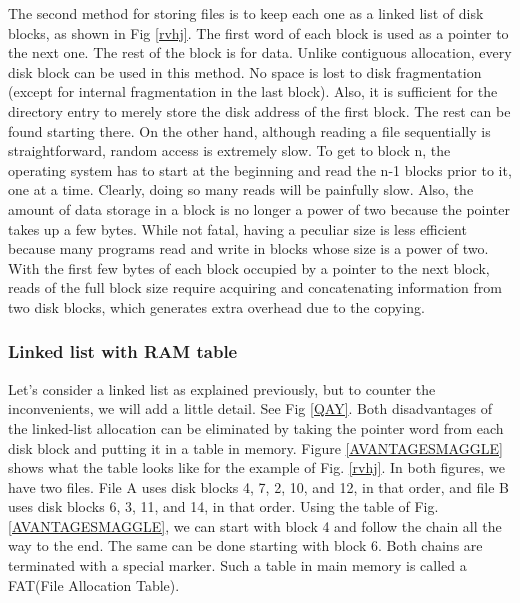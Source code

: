 The second method for storing files is to keep each one as a linked list of disk
blocks, as shown in Fig \ref{rvhj}. The first word of each block is used as a pointer to
the next one. The rest of the block is for data.
Unlike contiguous allocation, every disk block can be used in this method. No
space is lost to disk fragmentation (except for internal fragmentation in the last
block). Also, it is sufficient for the directory entry to merely store the disk address
of the first block. The rest can be found starting there.
On the other hand, although reading a file sequentially is straightforward, random
access is extremely slow. To get to block n, the operating system has to start
at the beginning and read the n-1 blocks prior to it, one at a time. Clearly, doing
so many reads will be painfully slow.
Also, the amount of data storage in a block is no longer a power of two because
the pointer takes up a few bytes. While not fatal, having a peculiar size is
less efficient because many programs read and write in blocks whose size is a power
of two. With the first few bytes of each block occupied by a pointer to the next
block, reads of the full block size require acquiring and concatenating information
from two disk blocks, which generates extra overhead due to the copying.



\newpage
\subsubsection{Linked list with RAM table}
Let's consider a linked list as explained previously, but to counter the inconvenients, we 
will add a little detail. See Fig \ref{QAY}.
Both disadvantages of the linked-list allocation can be eliminated by taking the
pointer word from each disk block and putting it in a table in memory. Figure \ref{AVANTAGESMAGGLE}
shows what the table looks like for the example of Fig. \ref{rvhj}. In both figures, we
have two files. File A uses disk blocks 4, 7, 2, 10, and 12, in that order, and file B
uses disk blocks 6, 3, 11, and 14, in that order. Using the table of Fig. \ref{AVANTAGESMAGGLE}, we can
start with block 4 and follow the chain all the way to the end. The same can be
done starting with block 6. Both chains are terminated with a special marker.
Such a table in main memory is called a FAT(File Allocation Table).

